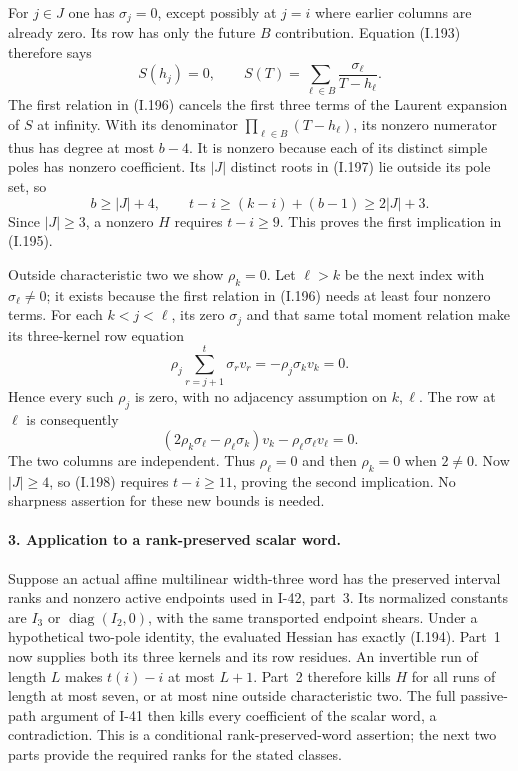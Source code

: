 For $j\in J$ one has $\sigma_j=0$, except possibly at
$j=i$ where earlier columns are already zero. Its row has
only the future $B$ contribution. Equation (I.193)
therefore says
\[
 S(h_j)=0,\qquad
 S(T)=\sum_{\ell\in B}\frac{\sigma_\ell}{T-h_\ell}.
 \tag{I.197}
\]
The first relation in (I.196) cancels the first three
terms of the Laurent expansion of $S$ at infinity.
With its denominator $\prod_{\ell\in B}(T-h_\ell)$,
its nonzero numerator thus has degree at most $b-4$.
It is nonzero because each of its distinct simple poles
has nonzero coefficient. Its $|J|$ distinct roots in
(I.197) lie outside its pole set, so
\[
 b\ge |J|+4,\qquad
 t-i\ge(k-i)+(b-1)\ge2|J|+3.
 \tag{I.198}
\]
Since $|J|\ge3$, a nonzero $H$ requires $t-i\ge9$.
This proves the first implication in (I.195).

Outside characteristic two we show $\rho_k=0$. Let
$\ell>k$ be the next index with $\sigma_\ell\ne0$;
it exists because the first relation in (I.196) needs at
least four nonzero terms. For each $k<j<\ell$, its
zero $\sigma_j$ and that same total moment relation make
its three-kernel row equation
\[
 \rho_j\sum_{r=j+1}^{t}\sigma_rv_r
       =-\rho_j\sigma_kv_k=0.
\]
Hence every such $\rho_j$ is zero, with no adjacency
assumption on $k,\ell$. The row at $\ell$ is consequently
\[
 (2\rho_k\sigma_\ell-\rho_\ell\sigma_k)v_k
          -\rho_\ell\sigma_\ell v_\ell=0.
 \tag{I.199}
\]
The two columns are independent. Thus $\rho_\ell=0$ and
then $\rho_k=0$ when $2\ne0$. Now $|J|\ge4$, so (I.198)
requires $t-i\ge11$, proving the second implication.
No sharpness assertion for these new bounds is needed.

\paragraph{3. Application to a rank-preserved scalar word.}
Suppose an actual affine multilinear width-three word has
the preserved interval ranks and nonzero active endpoints
used in I-42, part~3. Its normalized constants are $I_3$
or $\operatorname{diag}(I_2,0)$, with the same transported
endpoint shears. Under a hypothetical two-pole identity,
the evaluated Hessian has exactly (I.194). Part~1 now
supplies both its three kernels and its row residues.
An invertible run of length $L$ makes $t(i)-i$ at most
$L+1$. Part~2 therefore kills $H$ for all runs of length
at most seven, or at most nine outside characteristic two.
The full passive-path argument of I-41 then kills every
coefficient of the scalar word, a contradiction. This is
a conditional rank-preserved-word assertion; the next two
parts provide the required ranks for the stated classes.

